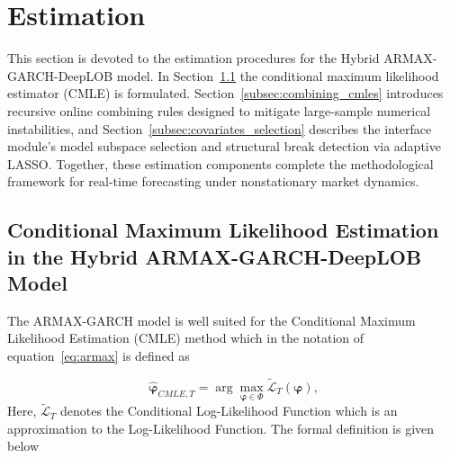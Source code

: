 \documentclass[10pt,a4paper,oneside]{article}
\begin{document}

\section{Estimation}
\label{Sect:Estimation}
This section is devoted to the estimation procedures for the Hybrid ARMAX-GARCH-DeepLOB model.  In Section~\ref{subsec:cmle_props_paper} the conditional maximum likelihood estimator (CMLE) is formulated.  Section~\ref{subsec:combining_cmles} introduces recursive online combining rules designed to mitigate large-sample numerical instabilities, and Section~\ref{subsec:covariates_selection} describes the interface module’s model subspace selection and structural break detection via adaptive LASSO.  Together, these estimation components complete the methodological framework for real-time forecasting under nonstationary market dynamics.


\subsection{Conditional Maximum Likelihood Estimation in the Hybrid ARMAX-GARCH-DeepLOB Model}
\label{subsec:cmle_props_paper}
The ARMAX-GARCH model is well suited for the Conditional Maximum Likelihood Estimation (CMLE) method which in the notation of equation~\eqref{eq:armax} is defined as

$$
    \hat{\boldsymbol{\varphi}}_{CMLE, T} = \arg\max_{\boldsymbol{\varphi} \in \Phi} {\tilde{\mathcal{L}}_{T}}(\boldsymbol{\varphi}),
$$
Here, $\tilde{\mathcal{L}}_{T}$ denotes the Conditional Log-Likelihood Function which is an approximation to the Log-Likelihood Function. The formal definition is given below
\end{document}
